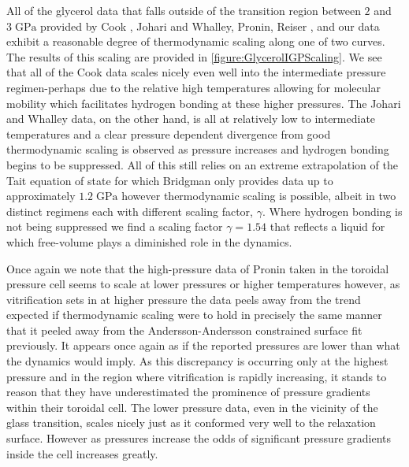 All of the glycerol data that falls outside of the transition region between $2$ and $3\;\si{\giga\pascal}$ provided by Cook \etal, Johari and Whalley, Pronin, Reiser \etal, and our \tgp data exhibit a reasonable degree of thermodynamic scaling along one of two curves.  The results of this scaling are provided in \fig \nolinebreak \ref{figure:GlycerolIGPScaling}.  We see that all of the Cook \etal data scales nicely even well into the intermediate pressure regimen-perhaps due to the relative high temperatures allowing for molecular mobility which facilitates hydrogen bonding at these higher pressures. The Johari and Whalley data, on the other hand, is all at relatively low to intermediate temperatures and a clear pressure dependent divergence from good thermodynamic scaling is observed as pressure increases and hydrogen bonding begins to be suppressed.  All of this still relies on an extreme extrapolation of the Tait equation of state for which Bridgman only provides data up to approximately $1.2\;\si{\giga\pascal}$ however thermodynamic scaling is possible, albeit in two distinct regimens each with different scaling factor, $\gamma$.  Where hydrogen bonding is not being suppressed we find a scaling factor $\gamma=1.54$ that reflects a liquid for which free-volume plays a diminished role in the dynamics. 

Once again we note that the high-pressure data of Pronin \etal taken in the toroidal pressure cell seems to scale at lower pressures or higher temperatures however, as vitrification sets in at higher pressure the data peels away from the trend expected if thermodynamic scaling were to hold in precisely the same manner that it peeled away from the Andersson-Andersson constrained surface fit previously. It appears once again as if the reported pressures are lower than what the dynamics would imply.  As this discrepancy is occurring only at the highest pressure and in the region where vitrification is rapidly increasing, it stands to reason that they have underestimated the prominence of pressure gradients within their toroidal cell. The lower pressure data, even in the vicinity of the glass transition, scales nicely just as it conformed very well to the relaxation surface.  However as pressures increase the odds of significant pressure gradients inside the cell increases greatly.  